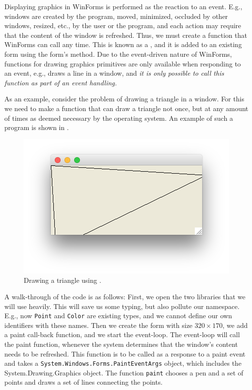 \documentclass[fsharpnotes.tex]{subfiles}
\begin{document}
Displaying graphics in WinForms is performed as the reaction to an event. E.g., windows are created by the program, moved, minimized, occluded by other windows, resized, etc., by the user or the program, and each action may require that the content of the window is refreshed. Thus, we must create a function that WinForms can call any time. This is known as a , and it is added to an existing form using the form's  method. Due to the event-driven nature of WinForms, functions for drawing graphics primitives are only available when responding to an event, e.g.,  draws a line in a window, and \emph{it is only possible to call this function as part of an event handling.}

As an example, consider the problem of drawing a triangle in a window. For this we need to make a function that can draw a triangle not once, but at any amount of times as deemed necessary by the operating system. An example of such a program is shown in .
%
%
\begin{figure}
  \centering
  \includegraphics[scale=0.3]{triangle}
  \caption{Drawing a triangle using .}
  \label{fig:triangle}
\end{figure}
%
A walk-through of the code is as follows: First, we open the two libraries that we will use heavily. This will save us some typing, but also pollute our namespace. E.g., now \lstinline{Point} and \lstinline{Color} are existing types, and we cannot define our own identifiers with these names. Then we create the form with size $320\times 170$, we add a paint call-back function, and we start the event-loop. The event-loop will call the paint function, whenever the system determines that the window's content needs to be refreshed. This function is to be called as a response to a paint event and takes a \lstinline!System.Windows.Forms.PaintEventArgs! object, which includes the System.Drawing.Graphics object. The function \lstinline{paint} chooses a pen and a set of points and draws a set of lines connecting the points.
\end{document}
